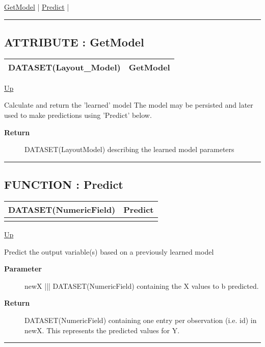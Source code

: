 \hyperlink{ecldoc:ml_core.interfaces.iregression.getmodel}{GetModel}  |
\hyperlink{ecldoc:ml_core.interfaces.iregression.predict}{Predict}  |

\rule{\textwidth}{0.4pt}

\subsection*{ATTRIBUTE : GetModel}
\hypertarget{ecldoc:ml_core.interfaces.iregression.getmodel}{}

{\renewcommand{\arraystretch}{1.5}
\begin{tabularx}{\textwidth}{|>{\raggedright\arraybackslash}l|X|}
\hline
\hspace{0pt}DATASET(Layout\_Model) & GetModel \\
\hline
\end{tabularx}
}

\hyperlink{ecldoc:ml_core.interfaces.iregression}{Up}

\par
Calculate and return the 'learned' model The model may be persisted and later used to make predictions using 'Predict' below.

\par
\begin{description}
\item [\textbf{Return}] DATASET(LayoutModel) describing the learned model parameters
\end{description}

\rule{\textwidth}{0.4pt}
\subsection*{FUNCTION : Predict}
\hypertarget{ecldoc:ml_core.interfaces.iregression.predict}{}

{\renewcommand{\arraystretch}{1.5}
\begin{tabularx}{\textwidth}{|>{\raggedright\arraybackslash}l|X|}
\hline
\hspace{0pt}DATASET(NumericField) & Predict \\
\hline
\multicolumn{2}{|>{\raggedright\arraybackslash}X|}{\hspace{0pt}(DATASET(NumericField) newX, DATASET(Layout\_Model) model)} \\
\hline
\end{tabularx}
}

\hyperlink{ecldoc:ml_core.interfaces.iregression}{Up}

\par
Predict the output variable(s) based on a previously learned model

\par
\begin{description}
\item [\textbf{Parameter}] newX ||| DATASET(NumericField) containing the X values to b predicted.
\item [\textbf{Return}] DATASET(NumericField) containing one entry per observation (i.e. id) in newX. This represents the predicted values for Y.
\end{description}

\rule{\textwidth}{0.4pt}


